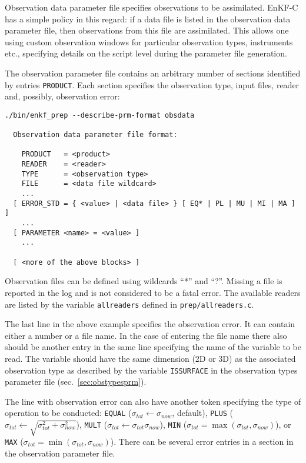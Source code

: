 \documentclass[11pt]{report}
\begin{document}
Observation data parameter file specifies observations to be assimilated.
EnKF-C has a simple policy in this regard: if a data file is listed in the observation data parameter file, then observations from this file are assimilated.
This allows one using custom observation windows for particular observation types, instruments etc., specifying details on the script level during the parameter file generation.

The observation parameter file contains an arbitrary number of sections identified by entries \verb|PRODUCT|.
Each section specifies the observation type, input files, reader and, possibly, observation error:
\begin{Verbatim}[frame=single,fontsize=\footnotesize]
./bin/enkf_prep --describe-prm-format obsdata

  Observation data parameter file format:

    PRODUCT   = <product>
    READER    = <reader>
    TYPE      = <observation type>
    FILE      = <data file wildcard> 
    ...
  [ ERROR_STD = { <value> | <data file> } [ EQ* | PL | MU | MI | MA ] ]
    ...
  [ PARAMETER <name> = <value> ]
    ...

  [ <more of the above blocks> ]
\end{Verbatim}
Observation files can be defined using wildcards ``*'' and ``?''.
Missing a file is reported in the log and is not considered to be a fatal error.
The available readers are listed by the variable \verb|allreaders| defined in \verb|prep/allreaders.c|.

The last line in the above example specifies the observation error.
It can contain either a number or a file name.
In the case of entering the file name there also should be another entry in the same line specifying the name of the variable to be read.
The variable should have the same dimension (2D or 3D) as the associated observation type as described by the variable \verb|ISSURFACE| in the observation types parameter file (sec.~\ref{sec:obstypesprm}).

The line with observation error can also have another token specifying the type of operation to be conducted: \verb|EQUAL| ($\sigma_{tot} \leftarrow \sigma_{now}$, default), \verb|PLUS| ($\sigma_{tot} \leftarrow \sqrt{\sigma_{tot}^2 + \sigma_{now}^2}$), \verb|MULT| ($\sigma_{tot} \leftarrow \sigma_{tot} \sigma_{now}$), \verb|MIN| ($\sigma_{tot} = \max(\sigma_{tot}, \sigma_{now})$), or \verb|MAX| ($\sigma_{tot} = \min(\sigma_{tot}, \sigma_{now})$).
There can be several error entries in a section in the observation parameter file.
\end{document}
